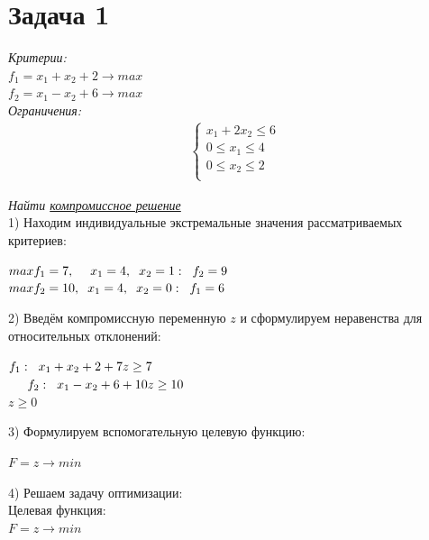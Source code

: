 \documentclass[14pt,fleqn]{extarticle}
\begin{document}
	\section*{Задача 1}
	\textit{Критерии:}\\
	$f_1 = x_1 + x_2 + 2 \longrightarrow max$\\
	$f_2 = x_1 - x_2 + 6 \longrightarrow max$\\
	
	\textit{Ограничения:}
	\begin{align*}
		\begin{cases}
			x_1 + 2x_2 \leq 6\\
			0 \leq x_1 \leq 4\\
			0 \leq x_2 \leq 2\\
		\end{cases}
	\end{align*}
	
	\textit{Найти \underline{компромиссное решение}}\\
	
	1) Находим индивидуальные экстремальные значения рассматриваемых критериев:
	\begin{center}
		$max f_1 = 7, \hspace{0.45cm} x_1 = 4, \hspace{0.2cm} x_2 = 1: \hspace{0.2cm} f_2 = 9$\\
		$max f_2 = 10, \hspace{0.2cm} x_1 = 4, \hspace{0.2cm} x_2 = 0: \hspace{0.2cm} f_1 = 6$
	\end{center}

	2) Введём компромиссную переменную $z$ и сформулируем неравенства для относительных отклонений:
	\begin{center}
		$f_1: \hspace{0.2cm} x_1 + x_2 + 2 + 7z \geq 7$\\
		$\hspace{0.52cm} f_2: \hspace{0.2cm} x_1 - x_2 + 6 + 10z \geq 10$\\
		$z \geq 0$
	\end{center}
	3) Формулируем вспомогательную целевую функцию:
	\begin{center}
		$F = z \longrightarrow min$
	\end{center}
	4) Решаем задачу оптимизации:\\
	
	Целевая функция:\\
	$F = z \longrightarrow min$\\
	
\end{document}
